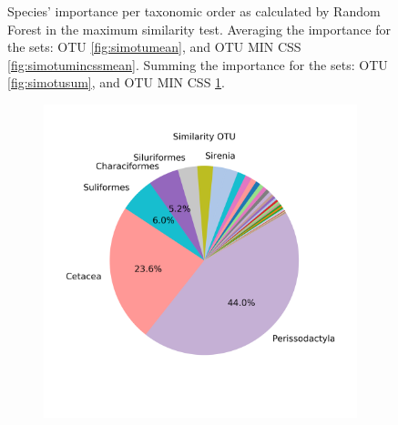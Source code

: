 \begin{figure}[h]
\begin{subfigure}{0.45\textwidth}
		\caption{}
		\label{fig:simotumincsssum}
	\end{subfigure}
	\caption{Species' importance per taxonomic order as calculated by Random Forest in the maximum similarity test. Averaging the importance for the sets: OTU \ref{fig:simotumean}, and OTU MIN CSS \ref{fig:simotumincssmean}. Summing the importance for the sets: OTU \ref{fig:simotusum}, and OTU MIN CSS \ref{fig:simotumincsssum}.  }
	\label{fig:simpieappendix}
\end{figure}

\begin{figure}[h]
	\centering
	\begin{subfigure}{0.45\textwidth}
		\includegraphics[width=\textwidth]{rfr_dis_mean_pieOTU}
		\caption{}
		\label{fig:dissimotumean}
	\end{subfigure}	
	\begin{subfigure}{0.45\textwidth}

\end{subfigure}
\end{figure}
